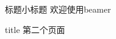\documentclass{beamer}
\begin{document}
\begin{frame}{标题}{小标题}
欢迎使用beamer
\end{frame}
\begin{frame}[t]{title}
第二个页面
\end{frame}
\end{document}
